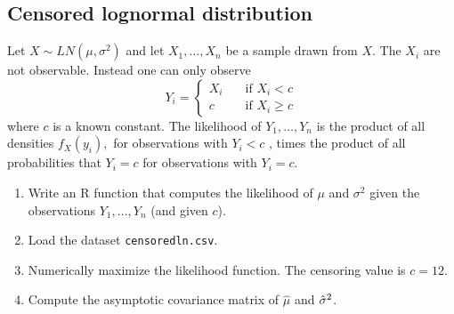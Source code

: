 \documentclass{article}
\begin{document}
\subsection{Censored lognormal distribution\label{mllognormal}}

Let $X\sim LN(\mu ,\sigma ^{2})$ and let $X_{1},\ldots ,X_{n}$ be a sample
drawn from $X$. The $X_{i}$ are not observable. Instead one can only observe%
\begin{equation*}
Y_{i}=\left\{
\begin{array}{ll}
X_{i} & \quad \text{if }X_{i}<c \\
c & \quad \text{if }X_{i}\geq c%
\end{array}%
\right.
\end{equation*}%
where $c$ is a known constant. The likelihood of $Y_{1},\ldots ,Y_{n}$ is
the product of all densities $f_{X}(y_{i}),$ for observations with $Y_{i}<c$%
, times the product of all probabilities that $Y_{i}=c$ for observations
with $Y_{i}=c$.

\begin{enumerate}
\item Write an R function that computes the likelihood of $\mu $ and $\sigma
^{2}$ given the observations $Y_{1},\ldots ,Y_{n}$ (and given $c$).

\item Load the dataset \texttt{censoredln.csv}.

\item Numerically maximize the likelihood function. The censoring value is $%
c=12.$

\item Compute the asymptotic covariance matrix of $\hat{\mu}$ and $\hat{%
\sigma}^{2}$.
\end{enumerate}
\end{document}
